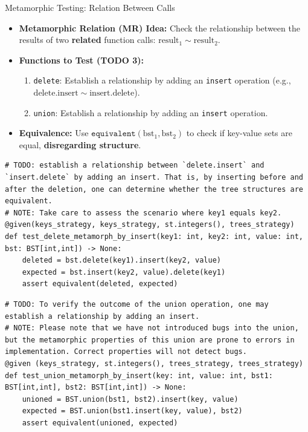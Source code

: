 \documentclass{beamer}
\begin{document}
\begin{frame}{Metamorphic Testing: Relation Between Calls}
    \begin{itemize}
        \item \textbf{Metamorphic Relation (MR) Idea:} Check the relationship between the results of two \textbf{related} function calls: $\text{result}_1 \sim \text{result}_2$.
        \item \textbf{Functions to Test (TODO 3):}
        \begin{enumerate}
            \item \texttt{delete}: Establish a relationship by adding an \texttt{insert} operation (e.g., $\text{delete}.\text{insert} \sim \text{insert}.\text{delete}$).
            \item \texttt{union}: Establish a relationship by adding an \texttt{insert} operation.
        \end{enumerate}
        \item \textbf{Equivalence:} Use $\texttt{equivalent}(\text{bst}_1, \text{bst}_2)$ to check if key-value sets are equal, \textbf{disregarding structure}.
    \end{itemize}

        \framebreak

    \begin{lstlisting}
# TODO: establish a relationship between `delete.insert` and `insert.delete` by adding an insert. That is, by inserting before and after the deletion, one can determine whether the tree structures are equivalent.
# NOTE: Take care to assess the scenario where key1 equals key2.
@given(keys_strategy, keys_strategy, st.integers(), trees_strategy)
def test_delete_metamorph_by_insert(key1: int, key2: int, value: int, bst: BST[int,int]) -> None:
    deleted = bst.delete(key1).insert(key2, value)
    expected = bst.insert(key2, value).delete(key1)
    assert equivalent(deleted, expected)
    \end{lstlisting}

    \begin{lstlisting}
# TODO: To verify the outcome of the union operation, one may establish a relationship by adding an insert.
# NOTE: Please note that we have not introduced bugs into the union, but the metamorphic properties of this union are prone to errors in implementation. Correct properties will not detect bugs.
@given (keys_strategy, st.integers(), trees_strategy, trees_strategy)
def test_union_metamorph_by_insert(key: int, value: int, bst1: BST[int,int], bst2: BST[int,int]) -> None:
    unioned = BST.union(bst1, bst2).insert(key, value)
    expected = BST.union(bst1.insert(key, value), bst2)
    assert equivalent(unioned, expected)
    \end{lstlisting}
\end{frame}
\end{document}
